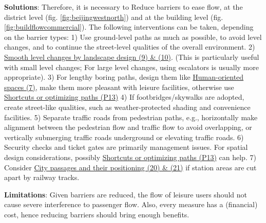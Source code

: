 \documentclass[]{article}
\begin{document}
{\textbf{Solutions}: Therefore, it is necessary to Reduce barriers to ease flow, at the district level (fig. \ref{fig:beijingwestnorth}) and at the building level (fig. \ref{fig:buildflowcommercial}). The following interventions can be taken, depending on the barrier types:
1) Use ground-level paths as much as possible, to avoid level changes, and to continue the street-level qualities of the overall environment.
2) \hyperref[(9 10) Smooth level changes by landscape design]{Smooth level changes by landscape design (9) \& (10)}. (This is particularly useful with small level changes; For large level changes, using escalators is usually more appropriate).
3) For lengthy boring paths, design them like \hyperref[(7) Human-oriented spaces]{Human-oriented spaces (7)}, make them more pleasant with leisure facilities, otherwise use \hyperref[(P13) Shortcuts or optimizing paths]{Shortcuts or optimizing paths (P13)}
4) If footbridges/skywalks are adopted, create street-like qualities, such as weather-protected shading and convenience facilities.
5) Separate traffic roads from pedestrian paths, e.g., horizontally make alignment between the pedestrian flow and traffic flow to avoid overlapping, or vertically submerging traffic roads underground or elevating traffic roads.
6) Security checks and ticket gates are primarily management issues. For spatial design considerations, possibly \hyperref[(P13) Shortcuts or optimizing paths]{Shortcuts or optimizing paths (P13)} can help. 
7) Consider \hyperref[(20 21) City passages and their positioning]{City passages and their positioning (20) \& (21)} if station areas are cut apart by railway tracks.




\textbf{Limitations}: Given barriers are reduced, the flow of leisure users should not cause severe interference to passenger flow. Also, every measure has a (financial) cost, hence reducing barriers should bring enough benefits.

}
\end{document}
